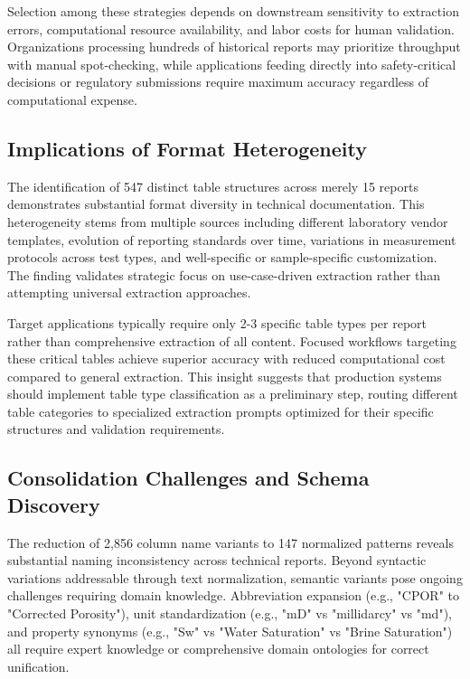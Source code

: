 \documentclass{svproc}
\begin{document}
Selection among these strategies depends on downstream sensitivity to extraction errors, computational resource availability, and labor costs for human validation. Organizations processing hundreds of historical reports may prioritize throughput with manual spot-checking, while applications feeding directly into safety-critical decisions or regulatory submissions require maximum accuracy regardless of computational expense.

\subsection{Implications of Format Heterogeneity}

The identification of 547 distinct table structures across merely 15 reports demonstrates substantial format diversity in technical documentation. This heterogeneity stems from multiple sources including different laboratory vendor templates, evolution of reporting standards over time, variations in measurement protocols across test types, and well-specific or sample-specific customization. The finding validates strategic focus on use-case-driven extraction rather than attempting universal extraction approaches.

Target applications typically require only 2-3 specific table types per report rather than comprehensive extraction of all content. Focused workflows targeting these critical tables achieve superior accuracy with reduced computational cost compared to general extraction. This insight suggests that production systems should implement table type classification as a preliminary step, routing different table categories to specialized extraction prompts optimized for their specific structures and validation requirements.

\subsection{Consolidation Challenges and Schema Discovery}

The reduction of 2,856 column name variants to 147 normalized patterns reveals substantial naming inconsistency across technical reports. Beyond syntactic variations addressable through text normalization, semantic variants pose ongoing challenges requiring domain knowledge. Abbreviation expansion (e.g., "CPOR" to "Corrected Porosity"), unit standardization (e.g., "mD" vs "millidarcy" vs "md"), and property synonyms (e.g., "Sw" vs "Water Saturation" vs "Brine Saturation") all require expert knowledge or comprehensive domain ontologies for correct unification.
\end{document}

